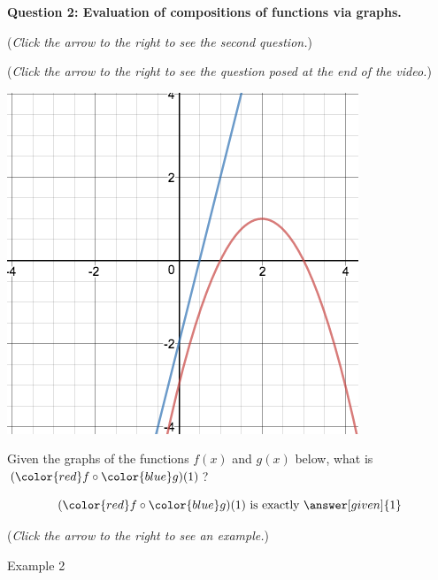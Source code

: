 \documentclass{ximera}
\begin{document}
\textbf{Question 2: Evaluation of compositions
of functions via graphs.}
\begin{question}
\begin{flushright}
{\color{blue}(\emph{Click the arrow to the right to see the second question.})}
\end{flushright}
\begin{center}
\begin{expandable}
{\color{blue}(\emph{Click the arrow to the right to see the question
posed at the end of the video.})}
\begin{expandable}
\begin{center}
\includegraphics[scale=0.3]{CompFuncGraph1.png}\\
\end{center}
Given the graphs of the functions {\color{red} $f(x)$}
and {\color{blue} $g(x)$} below, what is
$({\color{red} f} \circ {\color{blue} g})(1)$?\\
\begin{prompt}
\[
({\color{red} f} \circ {\color{blue} g})(1) \text{ is exactly }\answer[given]{1}
\]
\end{prompt}
\begin{flushright}
{\color{blue}(\emph{Click the arrow to the right to see an example.})}
\end{flushright}
\begin{expandable}
Example 2
\end{expandable}
\end{expandable}
\end{expandable}
\end{center}
\end{question}
\end{document}
